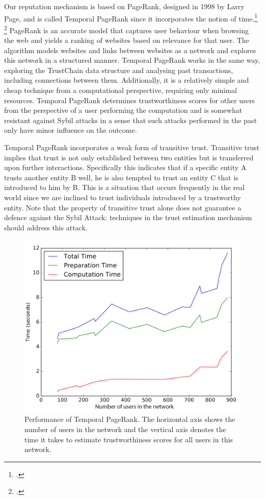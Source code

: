 \documentclass[USenglish]{article}
\begin{document}
Our reputation mechanism is based on PageRank, designed in 1998 by Larry Page, and is called Temporal PageRank since it incorporates the notion of time.\footcite{page1999pagerank}\,\footcite{otte2016sybil}
PageRank is an accurate model that captures user behaviour when browsing the web and yields a ranking of websites based on relevance for that user.
The algorithm models websites and links between websites as a network and explores this network in a structured manner.
Temporal PageRank works in the same way, exploring the TrustChain data structure and analysing past transactions, including connections between them.
Additionally, it is a relatively simple and cheap technique from a computational perspective, requiring only minimal resources.
Temporal PageRank determines trustworthiness scores for other users from the perspective of a user performing the computation and is somewhat resistant against Sybil attacks in a sense that such attacks performed in the past only have minor influence on the outcome.

Temporal PageRank incorporates a weak form of transitive trust.
Transitive trust implies that trust is not only established between two entities but is transferred upon further interactions.
Specifically this indicates that if a specific entity A trusts another entity B well, he is also tempted to trust an entity C that is introduced to him by B.
This is a situation that occurs frequently in the real world since we are inclined to trust individuals introduced by a trustworthy entity.
Note that the property of transitive trust alone does not guarantee a defence against the Sybil Attack: techniques in the trust estimation mechanism should address this attack.

\begin{figure}[t]
	\centering
	\includegraphics[width=0.6\columnwidth]{assets/pagerank_times}
	\caption{Performance of Temporal PageRank. The horizontal axis shows the number of users in the network and the vertical axis denotes the time it takes to estimate trustworthiness scores for all users in this network.}
	\label{fig:pagerank_performance}
\end{figure}
\end{document}
